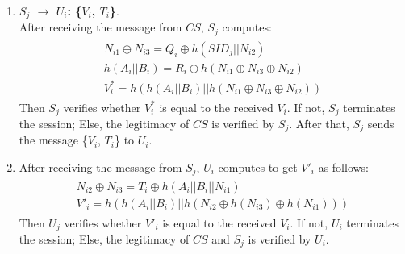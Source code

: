 \documentclass[preprint,12pt]{elsarticle}
\begin{document}
\begin{enumerate}[Step 1:]
\begin{eqnarray}
\begin{array}{l}
G^*_i=h(B_i||A_i||N_i1)
\end{array} \right.
\end{eqnarray}
Then $CS$ verifies whether $G^*$ is equal to the received $G_i$. If not, $CS$ terminates the session; Else, the legitimacy of $U_i$ is verified by $CS$. $CS$ randomly selects a number $N_{i3}$, and computes the following elements:
\begin{eqnarray}
\left.\begin{array}{l}
Q_i=N_{i1}\oplus N_{i3}\oplus h(SID_j||N_{i2})\\
R_i=h(A_i||B_i)\oplus h(N_{i1}\oplus N_{i2}\oplus N_{i3})\\
V_i=h(h(A_i||B_i)||h(N_{i1}\oplus N_{i2}\oplus N_{i3}))\\
T_i=N_{i2}\oplus N_{i3}\oplus h(A_i||B_i||N_{n1})
\end{array} \right.
\end{eqnarray}
Then $CS$ sends \{$Q_i$, $R_i$, $V_i$, $T_i$ \}to $S_i$ over a public channel.
\item \textbf{$S_j$ $\rightarrow$ $U_i$: \{$V_i$, $T_i$\}}.\\
After receiving the message from $CS$, $S_j$ computes:
\begin{eqnarray}
\left.\begin{array}{l}
N_{i1}\oplus N_{i3}=Q_i \oplus h(SID_j||N_{i2})\\
h(A_i||B_i)=R_i\oplus h(N_{i1}\oplus N_{i3}\oplus N_{i2})\\
V^*_i=h(h(A_i||B_i)||h(N_{i1}\oplus N_{i3}\oplus N_{i2}))
 \end{array} \right.
\end{eqnarray}
Then $S_j$ verifies whether $V^*_i$ is equal to the received $V_i$. If not, $S_j$ terminates the session; Else, the legitimacy of $CS$ is verified by $S_j$. After that, $S_j$ sends the message \{$V_i$, $T_i$\} to $U_i$.
\item
After receiving the message from $S_j$, $U_i$ computes to get $V'_i$ as follows:
\begin{eqnarray}
\left.\begin{array}{l}
N_{i2}\oplus N_{i3}=T_i \oplus h(A_i||B_i||N_{i1})\\
V'_i=h(h(A_i||B_i)||h(N_{i2}\oplus h(N_{i3})\oplus h(N_{i1})))
 \end{array} \right.
\end{eqnarray}
Then $U_j$ verifies whether $V'_i$ is equal to the received $V_i$. If not, $U_i$ terminates the session; Else, the legitimacy of $CS$ and $S_j$ is verified by $U_i$.
\end{enumerate}
\end{document}
